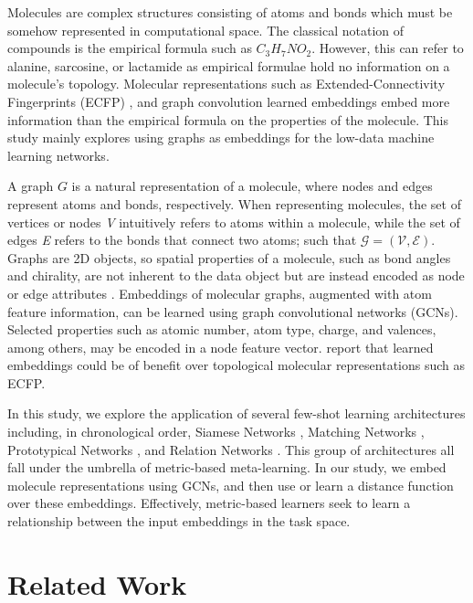 \documentclass[journal=jcisd8,manuscript=article]{achemso} %
\begin{document}
Molecules are complex structures consisting of atoms and bonds which must be somehow represented in computational space. The classical notation of compounds is the empirical formula such as $C_3H_7NO_2$. However, this can refer to alanine, sarcosine, or lactamide as empirical formulae hold no information on a molecule's topology. Molecular representations such as Extended-Connectivity Fingerprints (ECFP) \cite{rogers2010extended}, and graph convolution learned embeddings \cite{duvenaud2015convolutional} embed more information than the empirical formula on the properties of the molecule. This study mainly explores using graphs as embeddings for the low-data machine learning networks.

A graph $G$ is a natural representation of a molecule, where nodes and edges represent atoms and bonds, respectively. When representing molecules, the set of vertices or nodes \textit{V} intuitively refers to atoms within a molecule, while the set of edges \textit{E} refers to the bonds that connect two atoms; such that $\mathcal{G}=(\mathcal{V}, \mathcal{E})$. Graphs are 2D objects, so spatial properties of a molecule, such as bond angles and chirality, are not inherent to the data object but are instead encoded as node or edge attributes \cite{david2020molecular}. Embeddings of molecular graphs, augmented with atom feature information, can be learned using graph convolutional networks (GCNs). Selected properties such as atomic number, atom type, charge, and valences, among others, may be encoded in a node feature vector. \citet{wu2018moleculenet} report that learned embeddings could be of benefit over topological molecular representations such as ECFP.

In this study, we explore the application of several few-shot learning architectures including, in chronological order, Siamese Networks \citep{koch2015siamese}, Matching Networks \citep{vinyals2016matching}, Prototypical Networks \citep{snell2017prototypical}, and Relation Networks \citep{sung2018learning}. This group of architectures all fall under the umbrella of metric-based meta-learning. In our study, we embed molecule representations using GCNs, and then use or learn a distance function over these embeddings. Effectively, metric-based learners seek to learn a relationship between the input embeddings in the task space. 

\section{Related Work}
\end{document}
